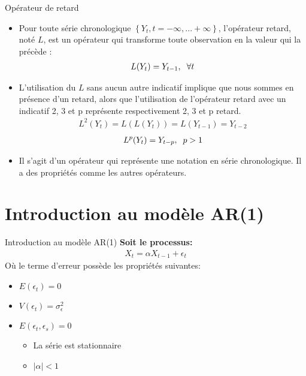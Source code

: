 \documentclass{beamer}
\begin{document}
\begin{frame}{Opérateur de retard}
\begin{itemize}
\item Pour toute série chronologique $\left\{Y_t, t = −\infty, ... + \infty \right\}$, l’opérateur retard, noté $L$, est un opérateur qui transforme toute observation en la valeur qui la précède :
\begin{align*}
L(Y_t )= Y_{t-1}, \hspace{0.2cm} \forall t
\end{align*}
\item L'utilisation du $L$ sans aucun autre indicatif implique que nous sommes en présence d'un retard, alors que l'utilisation de l'opérateur retard avec un indicatif 2, 3 et p représente respectivement 2, 3 et p retard.
\begin{align*}
L^{2}(Y_t)=L(L(Y_t))=L(Y_{t-1})=Y_{t-2}
\end{align*}
\begin{align*}
L^{p}(Y_t)=Y_{t-p}, \hspace{0.2cm} p>1
\end{align*}
\item Il s’agit d’un opérateur qui représente une notation en série chronologique. Il a des propriétés comme les autres opérateurs.
\end{itemize}
\end{frame}

\section{Introduction au modèle AR(1)}
\frame{\tableofcontents[current]}

\begin{frame}{Introduction au modèle AR(1)}
\textbf{Soit le processus:}
\begin{align*}
X_t=\alpha X_{t-1}+\epsilon_t
\end{align*}
Où le terme d'erreur possède les propriétés suivantes:
\begin{itemize}
\item $E(\epsilon_t )=0$
\item $V(\epsilon_t )=\sigma_{\epsilon}^2$ 
\item $E(\epsilon_t,\epsilon_s)=0$
\begin{itemize}
\item La série est stationnaire
\item $\mid \alpha \mid < 1$ 
\end{itemize}  
\end{itemize}
\end{frame}
\end{document}
